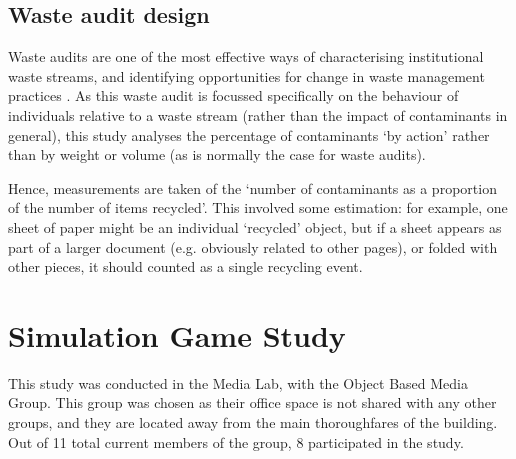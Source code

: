 \documentclass[nofonts,nols,justified,nobib]{tufte-book}
\begin{document}
\subsection*{Waste audit design}

Waste audits are one of the most effective ways of characterising institutional waste streams, and identifying opportunities for change in waste management practices \cite{smyth_reducing_2010}. As this waste audit is focussed specifically on the behaviour of individuals relative to a waste stream (rather than the impact of contaminants in general), this study analyses the percentage of contaminants `by action' rather than by weight or volume (as is normally the case for waste audits).

Hence, measurements are taken of the ‘number of contaminants as a proportion of the number of items recycled’. This involved some estimation: for example, one sheet of paper might be an individual ‘recycled’ object, but if a sheet appears as part of a larger document (e.g. obviously related to other pages), or folded with other pieces, it should counted as a single recycling event. 






\section*{Simulation Game Study}
This study was conducted in the Media Lab, with the Object Based Media Group. This group was chosen as their office space is not shared with any other groups, and they are located away from the main thoroughfares of the building. Out of 11 total current members of the group, 8 participated in the study.
\end{document}
